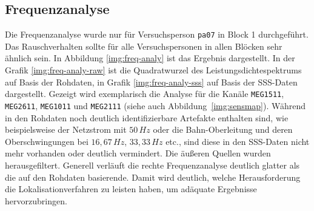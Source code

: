 \documentclass[doc,a4paper,12pt]{apa6}
\begin{document}
\subsection{Frequenzanalyse}
\label{sec:freq-analy}

Die Frequenzanalyse wurde nur für Versuchsperson \texttt{pa07} in Block 1 durchgeführt. Das Rauschverhalten sollte für alle Versuchspersonen in allen Blöcken sehr ähnlich sein. In Abbildung \ref{img:freq-analy} ist das Ergebnis dargestellt. In der Grafik \ref{img:freq-analy-raw} ist die Quadratwurzel des Leistungsdichtespektrums auf Basis der Rohdaten, in Grafik \ref{img:freq-analy-sss} auf Basis der SSS-Daten dargestellt. Gezeigt wird exemplarisch die Analyse für die Kanäle \texttt{MEG1511}, \texttt{MEG2611}, \texttt{MEG1011} und \texttt{MEG2111} (siehe auch Abbildung~\ref{img:sensmap}). Während in den Rohdaten noch deutlich identifizierbare Artefakte enthalten sind, wie beispielsweise der Netzstrom mit $50\,Hz$ oder die Bahn-Oberleitung und deren Oberschwingungen bei $16,67\,Hz$, $33,33\,Hz$ etc., sind diese in den SSS-Daten nicht mehr vorhanden oder deutlich vermindert. Die äußeren Quellen wurden herausgefiltert. Generell verläuft die rechte Frequenzanalyse deutlich glatter als die auf den Rohdaten basierende. Damit wird deutlich, welche Herausforderung die Lokalisationverfahren zu leisten haben, um adäquate Ergebnisse hervorzubringen.
\end{document}
